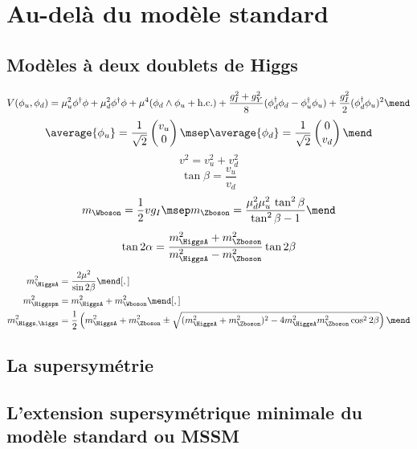 \section{Au-delà du modèle standard}\label{chapter-MS-MSSM-section-BSM}
\subsection{Modèles à deux doublets de Higgs}\label{chapter-MS-MSSM-section-BSM-subsec-dbl_H_dbl}
\begin{equation}
V(\phi_u,\phi_d)
=
\mu_u^2\phi^\dagger\phi
+
\mu_d^2\phi^\dagger\phi
+
\mu^4 (\phi_d\wedge\phi_u+\text{h.c.})
+
\frac{g_I^2+g_Y^2}{8} (\phi_d^\dagger\phi_d-\phi_u^\dagger\phi_u)
+
\frac{g_I^2}{2} (\phi_d^\dagger\phi_u)^2
\mend
\end{equation}
\begin{equation}
\average{\phi_u} = \frac{1}{\sqrt{2}} \begin{pmatrix}v_u \\ 0 \end{pmatrix}
\msep
\average{\phi_d} = \frac{1}{\sqrt{2}} \begin{pmatrix} 0\\ v_d \end{pmatrix}
\mend
\end{equation}
\begin{equation}
v^2 = v_u^2 + v_d^2
\end{equation}
\begin{equation}
\tan\beta = \frac{v_u}{v_d}
\end{equation}
\begin{equation}
m_{\Wboson} = \frac{1}{2} v g_I
\msep
m_{\Zboson} = \frac{\mu_d^2\mu_u^2 \, \tan^2\beta}{\tan^2\beta-1}
\mend
\end{equation}
\begin{equation}
\tan 2\alpha = \frac{m_{\HiggsA}^2+m_{\Zboson}^2}{m_{\HiggsA}^2-m_{\Zboson}^2} \tan 2\beta
\end{equation}
\begin{align}
m_{\HiggsA}^2 &= \frac{2\mu^2}{\sin 2\beta}
\mend[,]\\
m_{\Higgspm}^2 &= m_{\HiggsA}^2+m_{\Wboson}^2
\mend[,]\\
m_{\Higgs,\higgs}^2 &= \frac{1}{2} \left( m_{\HiggsA}^2+m_{\Zboson}^2 \pm \sqrt{(m_{\HiggsA}^2+m_{\Zboson}^2)^2-4m_{\HiggsA}^2m_{\Zboson}^2\cos^2 2\beta} \right)
\mend
\end{align}
\subsection{La supersymétrie}\label{chapter-MS-MSSM-section-BSM-subsec-SUSY}
\subsection{L'extension supersymétrique minimale du modèle standard ou MSSM}\label{chapter-MS-MSSM-section-BSM-subsec-MSSM}
